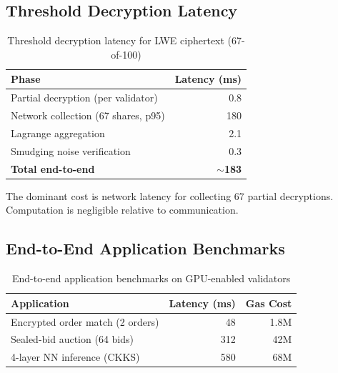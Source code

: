 \subsection{Threshold Decryption Latency}

\begin{table}[h]
\centering
\begin{tabular}{lr}
\toprule
\textbf{Phase} & \textbf{Latency (ms)} \\
\midrule
Partial decryption (per validator) & 0.8 \\
Network collection (67 shares, p95) & 180 \\
Lagrange aggregation & 2.1 \\
Smudging noise verification & 0.3 \\
\textbf{Total end-to-end} & \textbf{$\sim$183} \\
\bottomrule
\end{tabular}
\caption{Threshold decryption latency for LWE ciphertext (67-of-100)}
\label{tab:threshold}
\end{table}

The dominant cost is network latency for collecting 67 partial decryptions. Computation is negligible relative to communication.

\subsection{End-to-End Application Benchmarks}

\begin{table}[h]
\centering
\begin{tabular}{lrr}
\toprule
\textbf{Application} & \textbf{Latency (ms)} & \textbf{Gas Cost} \\
\midrule
Encrypted order match (2 orders) & 48 & 1.8M \\
Sealed-bid auction (64 bids) & 312 & 42M \\
4-layer NN inference (CKKS) & 580 & 68M \\
\bottomrule
\end{tabular}
\caption{End-to-end application benchmarks on GPU-enabled validators}
\label{tab:e2e}
\end{table}

